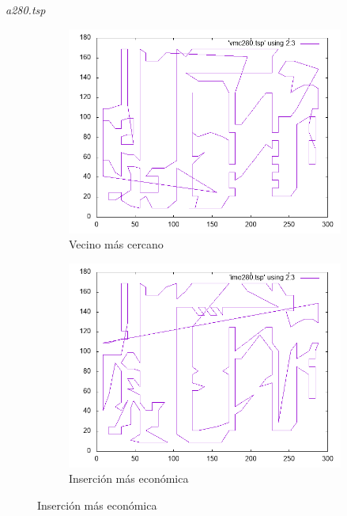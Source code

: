 \documentclass{beamer}
\begin{document}
\begin{frame}[fragile]{\textit{a280.tsp}}
\begin{figure}[H]
\centering
\begin{subfigure}[b]{0.36\textwidth}
\includegraphics[width=\textwidth]{a280_vmc.png}
\caption*{\small{Vecino más cercano}}
\end{subfigure}
\quad
\begin{subfigure}[b]{0.36\textwidth}
\includegraphics[width=\textwidth]{a280_ime.png}
\caption*{\small{Inserción más económica}}
\end{subfigure}

\vspace{0.25cm}


\end{figure}
\end{frame}
\end{document}
